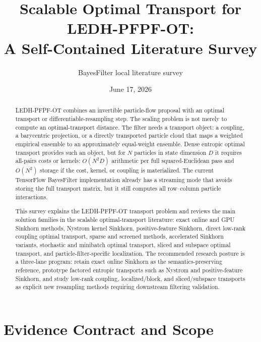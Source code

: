 \documentclass[11pt]{article}
\title{Scalable Optimal Transport for LEDH-PFPF-OT:\\
A Self-Contained Literature Survey}
\author{BayesFilter local literature survey}
\date{June 17, 2026}
\begin{document}
\maketitle

\begin{abstract}
LEDH-PFPF-OT combines an invertible particle-flow proposal with an optimal
transport or differentiable-resampling step.  The scaling problem is not merely
to compute an optimal-transport distance.  The filter needs a transport object:
a coupling, a barycentric projection, or a directly transported particle cloud
that maps a weighted empirical ensemble to an approximately equal-weight
ensemble.  Dense entropic optimal transport provides such an object, but for
$N$ particles in state dimension $D$ it requires all-pairs costs or kernels:
$O(N^2D)$ arithmetic per full squared-Euclidean pass and $O(N^2)$ storage if
the cost, kernel, or coupling is materialized.  The current TensorFlow
BayesFilter implementation already has a streaming mode that avoids storing
the full transport matrix, but it still computes all row--column particle
interactions.

This survey explains the LEDH-PFPF-OT transport problem and reviews the main
solution families in the scalable optimal-transport literature: exact online
and GPU Sinkhorn methods, Nystrom kernel Sinkhorn, positive-feature Sinkhorn,
direct low-rank coupling optimal transport, sparse and screened methods,
accelerated Sinkhorn variants, stochastic and minibatch optimal transport,
sliced and subspace optimal transport, and particle-filter-specific
localization.  The recommended research posture is a three-lane program:
retain exact online Sinkhorn as the semantics-preserving reference, prototype
factored entropic transports such as Nystrom and positive-feature Sinkhorn,
and study low-rank coupling, localized/block, and sliced/subspace transports
as explicit new resampling methods requiring downstream filtering validation.
\end{abstract}

\section{Evidence Contract and Scope}
\end{document}
